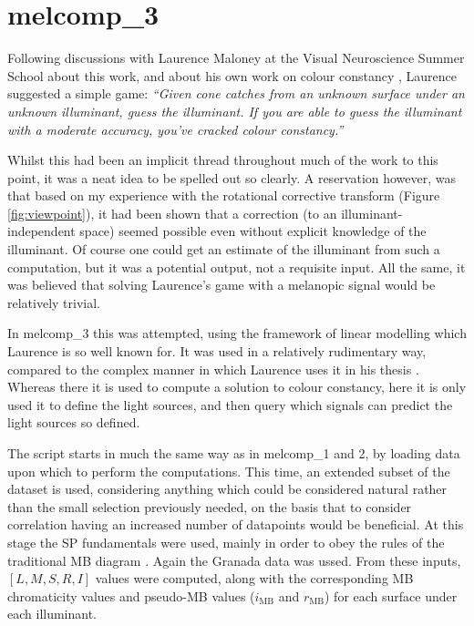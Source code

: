 \section{melcomp\_3}

Following discussions with Laurence Maloney at the Visual Neuroscience Summer School about this work, and about his own work on colour constancy \citep{maloney_computational_1984,maloney_color_1986}, Laurence suggested a simple game: \emph{``Given cone catches from an unknown surface under an unknown illuminant, guess the illuminant. If you are able to guess the illuminant with a moderate accuracy, you've cracked colour constancy.''}

Whilst this had been an implicit thread throughout much of the work to this point, it was a neat idea to be spelled out so clearly. A reservation however, was that based on my experience with the rotational corrective transform (Figure \ref{fig:viewpoint}), it had been shown that a correction (to an illuminant-independent space) seemed possible even without explicit knowledge of the illuminant. Of course one could get an estimate of the illuminant from such a computation, but it was a potential output, not a requisite input. All the same, it was believed that solving Laurence's game with a melanopic signal would be relatively trivial.

In melcomp\_3 this was attempted, using the framework of linear modelling which Laurence is so well known for. It was used in a relatively rudimentary way, compared to the complex manner in which Laurence uses it in his thesis \citep{maloney_computational_1984}. Whereas there it is used to compute a solution to colour constancy, here it is only used it to define the light sources, and then query which signals can predict the light sources so defined.

The script starts in much the same way as in melcomp\_1 and 2, by loading data upon which to perform the computations. This time, an extended subset of the \citet{vrhel_measurement_1994} dataset is used, considering anything which could be considered natural rather than the small selection previously needed, on the basis that to consider correlation having an increased number of datapoints would be beneficial. At this stage the \gls{SP} fundamentals were used, mainly in order to obey the rules of the traditional \gls{MB} diagram \citep{macleod_chromaticity_1979}. Again the Granada data \citep{hernandez-andres_color_2001} was ussed. From these inputs, $[L,M,S,R,I]$ values were computed, along with the corresponding \gls{MB} chromaticity values and pseudo-MB values ($i_{\text{MB}}$ and $r_{\text{MB}}$) for each surface under each illuminant.

